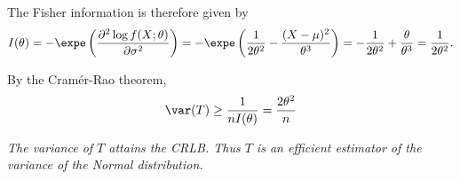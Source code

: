 \begin{solution}
The Fisher information is therefore given by
\begin{align*}
I(\theta) 
	= -\expe\left(\frac{\partial^2\log f(X;\theta)}{\partial\sigma^2}\right)
	= -\expe\left(\frac{1}{2\theta^2} - \frac{(X-\mu)^2}{\theta^3}\right)
	= -\frac{1}{2\theta^2} + \frac{\theta}{\theta^3} 
	= \frac{1}{2\theta^2}.
\end{align*}

%



By the Cram\'{e}r-Rao theorem,
\[
\var(T) \geq \frac{1}{nI(\theta)} = \frac{2\theta^2}{n}
\]

\vspace{2ex}
\bit
\it The variance of $T$ attains the CRLB.
\it Thus $T$ is an efficient estimator of the variance of the Normal distribution.
\eit

\end{solution}




\stopcontents[chapters]
\endinput
